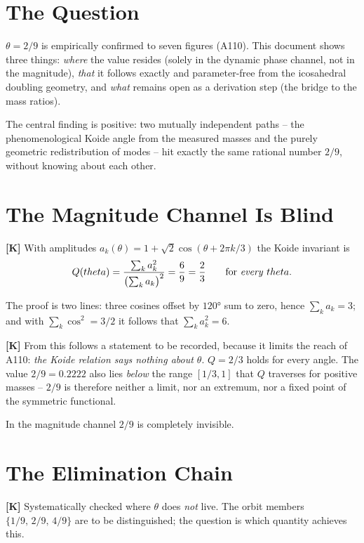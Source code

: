 \section{The Question}

$\theta = 2/9$ is empirically confirmed to seven figures (A110). This document
shows three things: \emph{where} the value resides (solely in the dynamic phase
channel, not in the magnitude), \emph{that} it follows exactly and parameter-free
from the icosahedral doubling geometry, and \emph{what} remains open as a
derivation step (the bridge to the mass ratios).

The central finding is positive: two mutually independent paths -- the
phenomenological Koide angle from the measured masses and the purely geometric
redistribution of modes -- hit exactly the same rational number $2/9$, without
knowing about each other.

\section{The Magnitude Channel Is Blind}

\textbf{[K]} With amplitudes $a_k(\theta) = 1 + \sqrt2\cos(\theta+2\pi k/3)$
the Koide invariant is
\[
  Q(\theta) = \frac{\sum_k a_k^2}{\bigl(\sum_k a_k\bigr)^2} = \frac{6}{9} = \frac23
  \qquad\text{for \emph{every} } \theta .
\]

The proof is two lines: three cosines offset by $120°$ sum to zero, hence
$\sum_k a_k = 3$; and with $\sum_k\cos^2 = 3/2$ it follows that $\sum_k a_k^2 = 6$.

\textbf{[K]} From this follows a statement to be recorded, because it limits the
reach of A110: \emph{the Koide relation says nothing about $\theta$}. $Q=2/3$
holds for every angle. The value $2/9 = 0{.}2222$ also lies \emph{below} the
range $[1/3,1]$ that $Q$ traverses for positive masses -- $2/9$ is therefore
neither a limit, nor an extremum, nor a fixed point of the symmetric functional.

In the magnitude channel $2/9$ is completely invisible.

\section{The Elimination Chain}

\textbf{[K]} Systematically checked where $\theta$ does \emph{not} live. The
orbit members $\{1/9,\,2/9,\,4/9\}$ are to be distinguished; the question is
which quantity achieves this.

